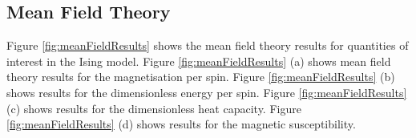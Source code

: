 \documentclass[11pt]{iopart}
\begin{document}
\subsection{Mean Field Theory}

Figure \ref{fig:meanFieldResults} shows the mean field theory results for quantities of interest in the Ising model. Figure \ref{fig:meanFieldResults} (a) shows mean field theory results for the magnetisation per spin. Figure \ref{fig:meanFieldResults} (b) shows results for the dimensionless energy per spin. Figure \ref{fig:meanFieldResults} (c) shows results for the dimensionless heat capacity. Figure \ref{fig:meanFieldResults} (d) shows results for the magnetic susceptibility.

\begin{figure}[b]
    \centering
    \quad
     \\
     \quad

\end{figure}
\end{document}
